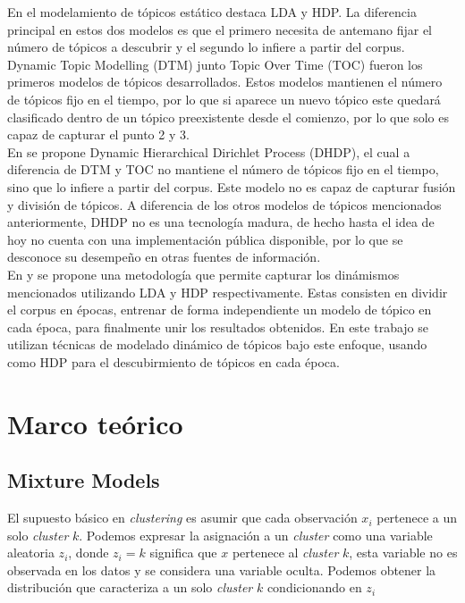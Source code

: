 \documentclass[letterpaper,12pt,oneside]{book} %
\begin{document}
En el modelamiento de tópicos estático destaca LDA y HDP. La diferencia principal en estos dos modelos es que el primero necesita de antemano fijar el número de tópicos a descubrir y el segundo lo infiere a partir del corpus.\\

Dynamic Topic Modelling (DTM) junto Topic Over Time (TOC)\citep{wang2006topics} fueron los primeros modelos de tópicos desarrollados. Estos modelos mantienen el número de tópicos fijo en el tiempo, por lo que si aparece un nuevo tópico este quedará clasificado dentro de un tópico preexistente desde el comienzo, por lo que solo es capaz de capturar el punto 2 y 3.\\

En \citep{ahmed2012timeline} se propone Dynamic Hierarchical Dirichlet Process (DHDP), el cual a diferencia de DTM y TOC no mantiene el número de tópicos fijo en el tiempo, sino que lo infiere a partir del corpus. Este modelo no es capaz de capturar fusión y división de tópicos. A diferencia de los otros modelos de tópicos mencionados anteriormente, DHDP no es una tecnología madura, de hecho hasta el idea de hoy no cuenta con una implementación pública disponible, por lo que se desconoce su desempeño en otras fuentes de información.\\

En \citep{wilson2011tracking} y \citep{beykikhoshk2018discovering} se propone una metodología que permite capturar los dinámismos mencionados utilizando LDA y HDP respectivamente. Estas consisten en dividir el corpus en épocas, entrenar de forma independiente un modelo de tópico en cada época, para finalmente unir los resultados obtenidos. En este trabajo se utilizan técnicas de modelado dinámico de tópicos bajo este enfoque, usando como HDP para el descubirmiento de tópicos en cada época.


\chapter{Marco teórico}
\section{Mixture Models}
\label{sec:mixture_model}

El supuesto básico en \textit{clustering} es asumir que cada observación $x_{i}$ pertenece a un solo \textit{cluster} $k$. Podemos expresar la asignación a un \textit{cluster} como una variable aleatoria $z_{i}$, donde $z_{i}=k$ significa que $x$ pertenece al \textit{cluster} $k$, esta variable no es observada en los datos y se considera una variable oculta. Podemos obtener la distribución que caracteriza a un solo \textit{cluster} $k$ condicionando en $z_{i}$
\end{document}
